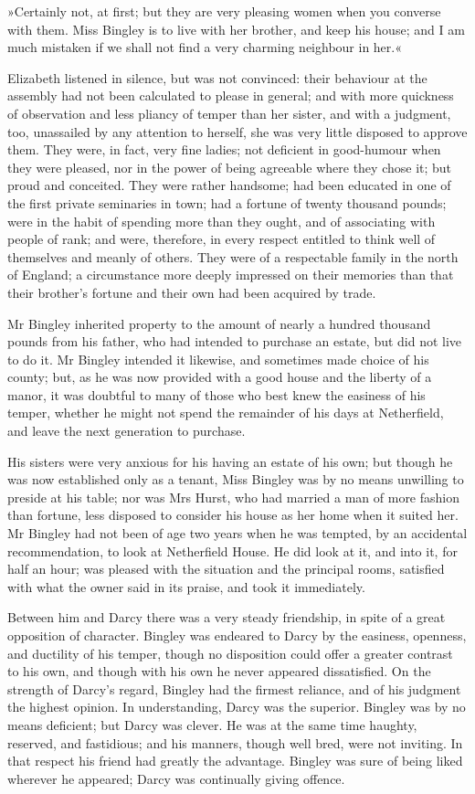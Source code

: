 »Certainly not, at first; but they are very pleasing women when you converse with them. Miss Bingley is to live with her brother, and keep his house; and I am much mistaken if we shall not find a very charming neighbour in her.«

Elizabeth listened in silence, but was not convinced: their behaviour at the assembly had not been calculated to please in general; and with more quickness of observation and less pliancy of temper than her sister, and with a judgment, too, unassailed by any attention to herself, she was very little disposed to approve them. They were, in fact, very fine ladies; not deficient in good-humour when they were pleased, nor in the power of being agreeable where they chose it; but proud and conceited. They were rather handsome; had been educated in one of the first private seminaries in town; had a fortune of twenty thousand pounds; were in the habit of spending more than they ought, and of associating with people of rank; and were, therefore, in every respect entitled to think well of themselves and meanly of others. They were of a respectable family in the north of England; a circumstance more deeply impressed on their memories than that their brother's fortune and their own had been acquired by trade.

Mr Bingley inherited property to the amount of nearly a hundred thousand pounds from his father, who had intended to purchase an estate, but did not live to do it. Mr Bingley intended it likewise, and sometimes made choice of his county; but, as he was now provided with a good house and the liberty of a manor, it was doubtful to many of those who best knew the easiness of his temper, whether he might not spend the remainder of his days at Netherfield, and leave the next generation to purchase.

His sisters were very anxious for his having an estate of his own; but though he was now established only as a tenant, Miss Bingley was by no means unwilling to preside at his table; nor was Mrs Hurst, who had married a man of more fashion than fortune, less disposed to consider his house as her home when it suited her. Mr Bingley had not been of age two years when he was tempted, by an accidental recommendation, to look at Netherfield House. He did look at it, and into it, for half an hour; was pleased with the situation and the principal rooms, satisfied with what the owner said in its praise, and took it immediately.

Between him and Darcy there was a very steady friendship, in spite of a great opposition of character. Bingley was endeared to Darcy by the easiness, openness, and ductility of his temper, though no disposition could offer a greater contrast to his own, and though with his own he never appeared dissatisfied. On the strength of Darcy's regard, Bingley had the firmest reliance, and of his judgment the highest opinion. In understanding, Darcy was the superior. Bingley was by no means deficient; but Darcy was clever. He was at the same time haughty, reserved, and fastidious; and his manners, though well bred, were not inviting. In that respect his friend had greatly the advantage. Bingley was sure of being liked wherever he appeared; Darcy was continually giving offence.

